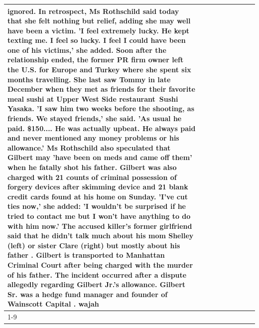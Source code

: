 \begin{table}[H]
\begin{tabular}{lllrlllll}
ignored. In retrospect, Ms Rothschild said today that she felt nothing but relief, adding she may well have been a victim. 'I feel extremely lucky. He kept texting me. I feel so lucky. I feel I could have been one of his victims,' she added. Soon after the relationship ended, the former PR firm owner left the U.S. for Europe and Turkey where she spent six months  travelling. She last saw Tommy in late December when they met as friends for their favorite meal sushi at Upper West Side restaurant Sushi Yasaka. 'I saw him two weeks before the shooting, as friends. We stayed friends,' she said. 'As usual he paid. \$150.... He was actually upbeat. He always paid and never mentioned any money problems or his allowance.' Ms Rothschild also speculated that Gilbert may 'have been on meds and came off them' when he fatally shot his father. Gilbert was also charged with 21 counts of criminal possession of forgery devices after skimming device and 21 blank credit cards found at his home on Sunday. 'I've cut ties now,' she added: 'I wouldn’t be surprised if he tried to contact me but I won’t have anything to do with him now.' The accused killer's former girlfriend said that he didn't talk much about his mom Shelley (left) or sister Clare (right) but mostly about his father . Gilbert is transported to Manhattan Criminal Court  after being charged with the murder of his father. The incident occurred after a dispute allegedly regarding Gilbert Jr.'s allowance. Gilbert Sr. was a hedge fund manager and founder of Wainscott Capital . wajah \\
\cline{1-9}

\end{tabular}
\end{table}
